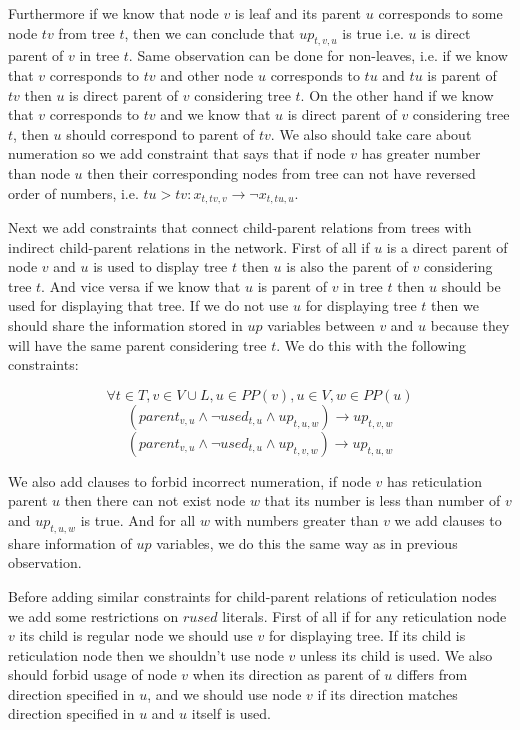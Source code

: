 \documentclass[runningheads, envcountsame, a4paper]{llncs}
\begin{document}
Furthermore if we know that node $v$ is leaf and its parent $u$ corresponds to some node $tv$ from tree $t$, 
then we can conclude that $up_{t,v,u}$ is true i.e. $u$ is direct parent of $v$ in tree $t$. Same observation 
can be done for non-leaves, i.e. if we know that $v$ corresponds to $tv$ and other node $u$ corresponds to $tu$ 
and $tu$ is parent of $tv$ then $u$ is direct parent of $v$ considering tree $t$. On the other hand if we know 
that $v$ corresponds to $tv$ and we know that $u$ is direct parent of $v$ considering tree $t$, then $u$ should 
correspond to parent of $tv$. We also should take care about numeration so we add constraint that says that if node 
$v$ has greater number than node $u$ then their corresponding nodes from tree can not have reversed order of 
numbers, i.e. $tu > tv : x_{t,tv,v} \rightarrow \neg x_{t,tu,u}$.

Next we add constraints that connect child-parent relations from trees with indirect child-parent relations in 
the network. First of all if $u$ is a direct parent of node $v$ and $u$ is used to display tree $t$ then $u$ is 
also the parent of $v$ considering tree $t$. And vice versa if we know that $u$ is parent of $v$ in tree $t$ then 
$u$ should be used for displaying that tree. If we do not use $u$ for displaying tree $t$ then we should share the 
information stored in $up$ variables between $v$ and $u$ because they will have the same parent considering tree $t$. 
We do this with the following constraints:

$$\forall t \in T,v \in V \cup L, u \in PP(v), u \in V, w \in PP(u)$$
$$(parent_{v,u} \wedge \neg used_{t,u} \wedge up_{t,u,w}) \rightarrow up_{t,v,w}$$
$$(parent_{v,u} \wedge \neg used_{t,u} \wedge up_{t,v,w}) \rightarrow up_{t,u,w}$$

We also add clauses to forbid incorrect numeration, if node $v$ has reticulation parent $u$ then there can not 
exist node $w$ that its number is less than number of $v$ and $up_{t,u,w}$ is true. And for all $w$ with numbers 
greater than $v$ we add clauses to share information of $up$ variables, we do this the same way as in previous observation.

Before adding similar constraints for child-parent relations of reticulation nodes we add some restrictions on
$rused$ literals. First of all if for any reticulation node $v$ its child is regular node we should use $v$ for 
displaying tree. If its child is reticulation node then we shouldn't use node $v$ unless its child is used. We 
also should forbid usage of node $v$ when its direction as parent of $u$ differs from direction specified in 
$u$, and we should use node $v$ if its direction matches direction specified in $u$ and $u$ itself is used.
\end{document}
